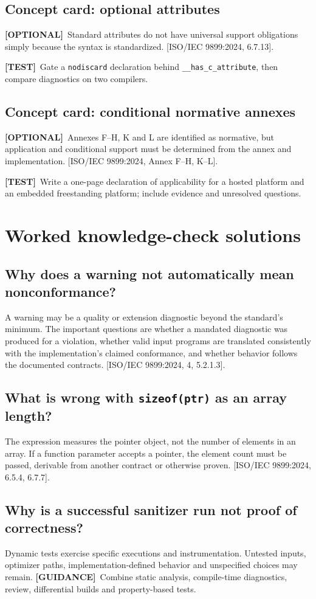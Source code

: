 \documentclass[10pt,letterpaper,oneside]{report}
\newcommand{\refcl}[1]{\textsf{\footnotesize[ISO/IEC 9899:2024, #1]}}
\newcommand{\optional}{\textbf{[OPTIONAL]}}
\newcommand{\guidance}{\textbf{[GUIDANCE]}}
\newcommand{\testtag}{\textbf{[TEST]}}
\begin{document}
\section{Concept card: optional attributes}
\optional\ Standard attributes do not have universal support obligations simply because the syntax is standardized. \refcl{6.7.13}.\par
\testtag\ Gate a \texttt{nodiscard} declaration behind \texttt{\_\_has\_c\_attribute}, then compare diagnostics on two compilers.
\section{Concept card: conditional normative annexes}
\optional\ Annexes F--H, K and L are identified as normative, but application and conditional support must be determined from the annex and implementation. \refcl{Annex F--H, K--L}.\par
\testtag\ Write a one-page declaration of applicability for a hosted platform and an embedded freestanding platform; include evidence and unresolved questions.
\chapter{Worked knowledge-check solutions}
\section{Why does a warning not automatically mean nonconformance?}
A warning may be a quality or extension diagnostic beyond the standard's minimum. The important questions are whether a mandated diagnostic was produced for a violation, whether valid input programs are translated consistently with the implementation's claimed conformance, and whether behavior follows the documented contracts. \refcl{4, 5.2.1.3}.
\section{What is wrong with \texttt{sizeof(ptr)} as an array length?}
The expression measures the pointer object, not the number of elements in an array. If a function parameter accepts a pointer, the element count must be passed, derivable from another contract or otherwise proven. \refcl{6.5.4, 6.7.7}.
\section{Why is a successful sanitizer run not proof of correctness?}
Dynamic tests exercise specific executions and instrumentation. Untested inputs, optimizer paths, implementation-defined behavior and unspecified choices may remain. \guidance\ Combine static analysis, compile-time diagnostics, review, differential builds and property-based tests.
\end{document}
